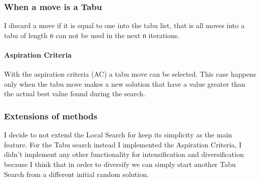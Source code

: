	\subsubsection{When a move is a Tabu}
		I discard a move if it is equal to one into the tabu list, that is all moves into a tabu of length \verb|n| can not be used in the next \verb|n| iterations.
		
		\paragraph{Aspiration Criteria} With the aspiration criteria (AC) a tabu move can be selected. This case happens only when the tabu move makes a new solution that have a value greater than the actual best value found during the search.
		
		
	\subsubsection{Extensions of methods}
		I decide to not extend the Local Search for keep its simplicity as the main feature. For the Tabu search instead I implemented the Aspiration Criteria, I didn't implement any other functionality for intensification and diversification because I think that in order to diversify we can simply start another Tabu Search from a different initial random solution.
	



	